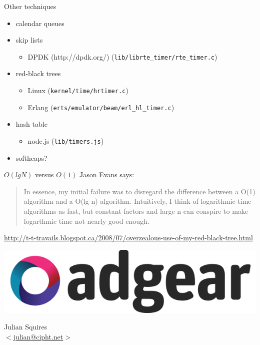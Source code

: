 \documentclass{beamer}
\begin{document}
\begin{frame}{Other techniques}
  \begin{itemize}
  \item calendar queues
  \item skip lists
    \begin{itemize}
    \item DPDK (http://dpdk.org/)
      (\texttt{lib/librte\_timer/rte\_timer.c})
    \end{itemize}
  \item red-black trees
    \begin{itemize}
    \item Linux (\texttt{kernel/time/hrtimer.c})
    \item Erlang (\texttt{erts/emulator/beam/erl\_hl\_timer.c})
    \end{itemize}
  \item hash table
    \begin{itemize}
    \item node.js (\texttt{lib/timers.js})
    \end{itemize}
  \item softheaps?
  \end{itemize}
\end{frame}

\begin{frame}{$O( lg N)$ versus $O(1)$}
Jason Evans says:

\begin{quotation}
In essence, my initial failure was to disregard the difference between
a O(1) algorithm and a O(lg n) algorithm. Intuitively, I think of
logarithmic-time algorithms as fast, but constant factors and large n
can conspire to make logarthmic time not nearly good enough.
\end{quotation}

\hyperlink{http://t-t-travails.blogspot.ca/2008/07/overzealous-use-of-my-red-black-tree.html}{http://t-t-travails.blogspot.ca/2008/07/overzealous-use-of-my-red-black-tree.html}

\end{frame}

\begin{frame}
  \includegraphics[width=\textwidth]{logo_adgear_smaller.png}
  \\
  \begin{center}
    Julian Squires \\
    \hyperlink{mailto:julian@cipht.net}{$<$julian@cipht.net$>$}
  \end{center}
\end{frame}
\end{document}
